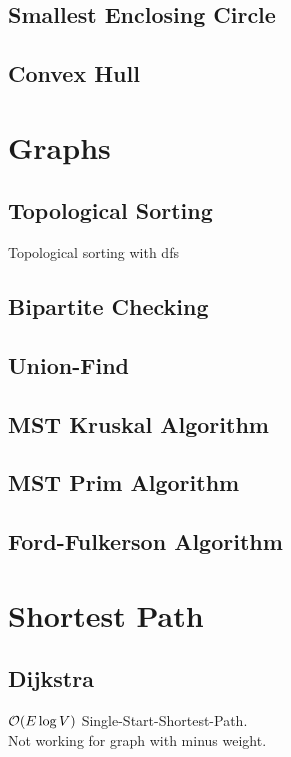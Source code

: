 \documentclass[landscape,8pt]{article}
\begin{document}
\begin{multicols}{2}
  \subsection{Smallest Enclosing Circle}

  \subsection{Convex Hull}
\columnbreak
\section{Graphs}
  \subsection{Topological Sorting}
  Topological sorting with dfs
    



  \subsection{Bipartite Checking}
    

  \subsection{Union-Find}
    
  \subsection{MST Kruskal Algorithm}
    

  \subsection{MST Prim Algorithm}
    
  \subsection{Ford-Fulkerson Algorithm}
\columnbreak

\section{Shortest Path}
  \subsection{Dijkstra}
    $\order{E \log V}$ Single-Start-Shortest-Path.\\
    Not working for graph with minus weight.
      


\end{multicols}
\end{document}
